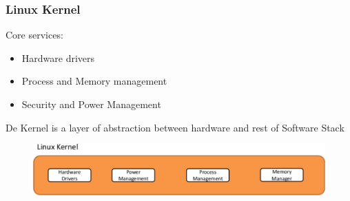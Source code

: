 \documentclass{beamer}
\begin{document}
{
	\begin{frame}[plain]
	\end{frame}
}
	
\begin{frame}
\frametitle{Linux Kernel}
Core services:
\begin{itemize}
\item Hardware drivers
\item Process and Memory management
\item Security and Power Management
\end{itemize}
De Kernel is a layer of abstraction between hardware and rest of Software Stack

\begin{figure}[b]
	\centering
		\includegraphics[width=\textwidth]{img/kernel.pdf}
	\label{fig:kernel}
\end{figure}

\end{frame}
\end{document}
